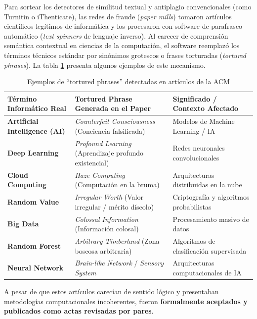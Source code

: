 \documentclass[12pt,a4paper]{article}
\begin{document}
Para sortear los detectores de similitud textual y antiplagio convencionales (como Turnitin o iThenticate), las redes de fraude (\textit{paper mills}) tomaron artículos científicos legítimos de informática y los procesaron con software de parafraseo automático (\textit{text spinners} de lenguaje inverso). Al carecer de comprensión semántica contextual en ciencias de la computación, el software reemplazó los términos técnicos estándar por sinónimos grotescos o \textquotedbl{}frases torturadas\textquotedbl{} (\textit{tortured phrases}). La tabla \ref{tab:torturedphrases} presenta algunos ejemplos de este mecanismo.
\begin{table}[htbp]
\centering
\caption{Ejemplos de ``tortured phrases'' detectadas en artículos de la ACM}
\label{tab:torturedphrases}
\begin{tabularx}{\linewidth}{XXX}
\toprule
\textbf{\textbf{Término Informático Real}} & \textbf{\textbf{\textquotedbl{}Tortured Phrase\textquotedbl{} Generada en el Paper}} & \textbf{\textbf{Significado / Contexto Afectado}} \\
\midrule
\textbf{Artificial Intelligence (AI)} & \textit{Counterfeit Consciousness} (Conciencia falsificada) & Modelos de Machine Learning / IA \\
\textbf{Deep Learning} & \textit{Profound Learning} (Aprendizaje profundo existencial) & Redes neuronales convolucionales \\
\textbf{Cloud Computing} & \textit{Haze Computing} (Computación en la bruma) & Arquitecturas distribuidas en la nube \\
\textbf{Random Value} & \textit{Irregular Worth} (Valor irregular / mérito díscolo) & Criptografía y algoritmos probabilistas \\
\textbf{Big Data} & \textit{Colossal Information} (Información colosal) & Procesamiento masivo de datos \\
\textbf{Random Forest} & \textit{Arbitrary Timberland} (Zona boscosa arbitraria) & Algoritmos de clasificación supervisada \\
\textbf{Neural Network} & \textit{Brain-like Network} / \textit{Sensory System} & Arquitecturas computacionales de IA \\
\bottomrule
\end{tabularx}
\end{table}
A pesar de que estos artículos carecían de sentido lógico y presentaban metodologías computacionales incoherentes, fueron \textbf{formalmente aceptados y publicados como actas revisadas por pares}.
\end{document}
